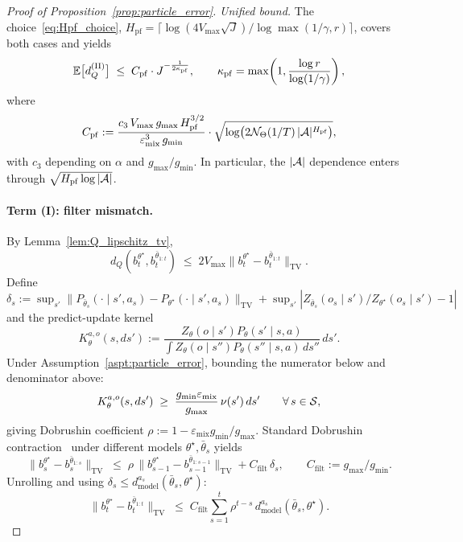 \begin{proof}[Proof of Proposition~\ref{prop:particle_error}]
\emph{Unified bound.} The choice~\eqref{eq:Hpf_choice}, $H_{\mathrm{pf}}=\lceil\log(4V_{\max}\sqrt{J})/\log\max(1/\gamma,r)\rceil$, covers both cases and yields
\[
\mathbb{E}\bigl[d_Q^{\mathrm{(II)}}\bigr]\;\le\;C_{\mathrm{pf}}\cdot J^{-\frac{1}{2\kappa_{\mathrm{pf}}}},
\qquad
\kappa_{\mathrm{pf}}=\max\!\left(1,\frac{\log r}{\log(1/\gamma)}\right),
\]
where
\begin{equation}\label{eq:Cpf_explicit}
C_{\mathrm{pf}}:=\frac{c_3\,V_{\max}\,g_{\max}\,H_{\mathrm{pf}}^{3/2}}{\varepsilon_{\mathrm{mix}}^3\,g_{\min}}\cdot\sqrt{\log\bigl(2{\mathcal{N}}_\Theta(1/T)\,|{\mathcal{A}}|^{H_{\mathrm{pf}}}\bigr)},
\end{equation}
with $c_3$ depending on $\alpha$ and $g_{\max}/g_{\min}$. In particular, the $|{\mathcal{A}}|$ dependence enters through $\sqrt{H_{\mathrm{pf}}\log|{\mathcal{A}}|}$.

\paragraph{Term (I): filter mismatch.}
By Lemma~\ref{lem:Q_lipschitz_tv},
\[
d_Q(b_t^{\theta^\star},b_t^{\bar\theta_{1:t}})\;\le\; 2V_{\max}\|b_t^{\theta^\star}-b_t^{\bar\theta_{1:t}}\|_{\mathrm{TV}}.
\]
Define $\delta_s:=\sup_{s'}\|P_{\bar\theta_s}(\cdot\mid s',a_s)-P_{\theta^\star}(\cdot\mid s',a_s)\|_{\mathrm{TV}}+\sup_{s'}|Z_{\bar\theta_s}(o_s\mid s')/Z_{\theta^\star}(o_s\mid s')-1|$ and the predict-update kernel
\[
K_\theta^{a,o}(s,ds'):=\frac{Z_\theta(o\mid s')P_\theta(s'\mid s,a)}{\int Z_\theta(o\mid s'')P_\theta(s''\mid s,a)\,ds''}\,ds'.
\]
Under Assumption~\ref{aspt:particle_error}, bounding the numerator below and denominator above:
\begin{equation}\label{eq:kernel_doeblin}
K_\theta^{a,o}(s,ds')\;\ge\;\frac{g_{\min}\varepsilon_{\mathrm{mix}}}{g_{\max}}\,\nu(s')\,ds'
\qquad\forall\,s\in{\mathcal{S}},
\end{equation}
giving Dobrushin coefficient $\rho:=1-\varepsilon_{\mathrm{mix}}g_{\min}/g_{\max}$. Standard Dobrushin contraction~\citep[Theorem~4.3.1]{doucmoulinesolsson2014} under different models $\theta^\star,\bar\theta_s$ yields
\begin{equation}\label{eq:filter_recursion}
\|b_s^{\theta^\star}-b_s^{\bar\theta_{1:s}}\|_{\mathrm{TV}}
\;\le\;
\rho\,\|b_{s-1}^{\theta^\star}-b_{s-1}^{\bar\theta_{1:s-1}}\|_{\mathrm{TV}}+C_{\mathrm{filt}}\,\delta_s,
\qquad C_{\mathrm{filt}}:=g_{\max}/g_{\min}.
\end{equation}
Unrolling and using $\delta_s\le d_{\mathrm{model}}^{a_s}(\bar\theta_s,\theta^\star)$:
\[
\|b_t^{\theta^\star}-b_t^{\bar\theta_{1:t}}\|_{\mathrm{TV}}
\;\le\;
C_{\mathrm{filt}}\sum_{s=1}^t \rho^{t-s}\,d_{\mathrm{model}}^{a_s}(\bar\theta_s,\theta^\star).
\]


\end{proof}
